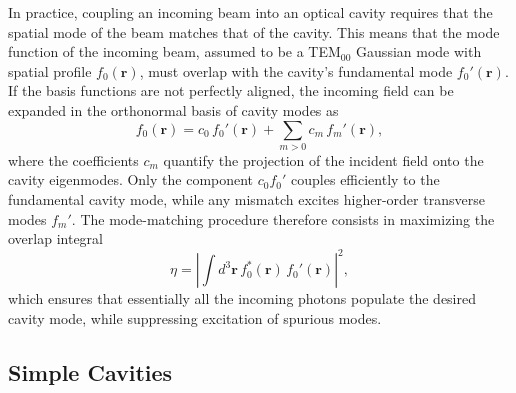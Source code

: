 In practice, coupling an incoming beam into an optical cavity requires that the spatial mode of the beam matches that of the cavity. This means that the mode function of the incoming beam, assumed to be a TEM$_{00}$ Gaussian mode with spatial profile
 $f_{0}(\mathbf{r})$, must overlap with the cavity’s fundamental mode $f_{0}'(\mathbf{r})$. If the basis functions are not perfectly aligned, the incoming field can be expanded in the orthonormal basis of cavity modes as
\begin{equation}
    f_{0}(\mathbf{r}) = c_{0}\, f_{0}'(\mathbf{r}) + \sum_{m>0} c_{m}\, f_{m}'(\mathbf{r}),
\end{equation}
where the coefficients $c_{m}$ quantify the projection of the incident field onto the cavity eigenmodes. Only the component $c_{0} f_{0}'$ couples efficiently to the fundamental cavity mode, while any mismatch excites higher-order transverse modes $f_{m}'$. The mode-matching procedure therefore consists in maximizing the overlap integral
\begin{equation}
    \eta = \left| \int d^{3}\mathbf{r}\, f_{0}^{*}(\mathbf{r})\, f_{0}'(\mathbf{r}) \right|^{2},
\end{equation}
which ensures that essentially all the incoming photons populate the desired cavity mode, while suppressing excitation of spurious modes.

\subsection{\textrm{Simple} Cavities}

